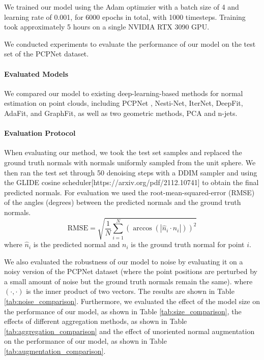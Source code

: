 \documentclass{acmart}
\begin{document}
We trained our model using the Adam optimzier with a batch size of 4 and learning rate of 0.001, for 6000 epochs in total, with 1000 timesteps. Training took approximately 5 hours on a single NVIDIA RTX 3090 GPU.

We conducted experiments to evaluate the performance of our model on the test set of the PCPNet dataset.

\paragraph{Evaluated Models}
We compared our model to existing deep-learning-based methods for normal estimation on point clouds, including PCPNet \cite{guerrero2018pcpnet}, Nesti-Net, IterNet, DeepFit, AdaFit, and GraphFit, as well as two geometric methods, PCA and n-jets.
\paragraph{Evaluation Protocol}
When evaluating our method, we took the test set samples and replaced the ground truth normals with normals uniformly sampled from the unit sphere. We then ran the test set through 50 denoising steps with a DDIM sampler and using the GLIDE cosine scheduler[https://arxiv.org/pdf/2112.10741] to obtain the final predicted normals.
For evaluation we used the root-mean-squared-error (RMSE) of the angles (degrees) between the predicted normals and the ground truth normals.
\begin{equation}
    \text{RMSE} = \sqrt{\frac{1}{N}\sum_{i=1}^{N}(\arccos(|\hat{n}_i \cdot n_i|))^2}
\end{equation}
where $\hat{n}_i$ is the predicted normal and $n_i$ is the ground truth normal for point $i$.

We also evaluated the robustness of our model to noise by evaluating it on a noisy version of the PCPNet dataset (where the point positions are perturbed by a small amount of noise but the ground truth normals remain the same). where $(\cdot, \cdot)$ is the inner product of two vectors. The results are shown in Table \ref{tab:noise_comparison}. Furthermore, we evaluated the effect of the model size on the performance of our model, as shown in Table \ref{tab:size_comparison}, the effects of different aggregation methods, as shown in Table \ref{tab:aggregation_comparison} and the effect of unoriented normal augmentation on the performance of our model, as shown in Table \ref{tab:augmentation_comparison}.
\end{document}
